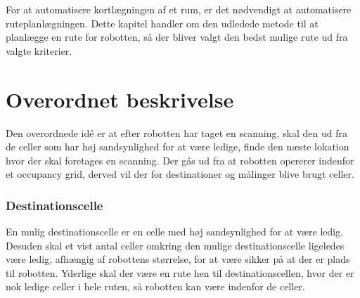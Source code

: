 
\newcommand{\unkcell}[3][]{\node (robot) [draw,fill=yellow, text centered, rectangle,
minimum height=\cellsize cm,minimum width=\cellsize cm, align=right] at ($(#2*\cellsize,#3*\cellsize) + (\cellsize/2,\cellsize/2)$) {$\scriptstyle #1$};}

\newcommand{\emptycell}[3][]{\node (robot) [draw,fill=green, text centered, rectangle,
minimum height=\cellsize cm,minimum width=\cellsize cm, align=right] at ($(#2*\cellsize,#3*\cellsize) + (\cellsize/2,\cellsize/2)$) {$\scriptstyle #1$};}

\newcommand{\occcell}[3][]{\node (robot) [draw,fill=red, text centered, rectangle,
minimum height=\cellsize cm,minimum width=\cellsize cm, align=right] at ($(#2*\cellsize,#3*\cellsize) + (\cellsize/2,\cellsize/2)$) {$\scriptstyle #1$};}

\newcommand{\scancell}[3][]{\node (robot) [draw,fill=orange, text centered, rectangle,
minimum height=\cellsize cm,minimum width=\cellsize cm, align=right] at ($(#2*\cellsize,#3*\cellsize) + (\cellsize/2,\cellsize/2)$) {$\scriptstyle #1$};}

\newcommand{\destcell}[3][]{\node (robot) [draw,fill=blue, text centered, rectangle,
minimum height=\cellsize cm,minimum width=\cellsize cm, align=right] at ($(#2*\cellsize,#3*\cellsize) + (\cellsize/2,\cellsize/2)$) {$\scriptstyle #1$};}

For at automatisere kortlægningen af et rum, er det nødvendigt at automatisere ruteplanlægningen.
Dette kapitel handler om den udledede metode til at planlægge en rute for robotten, så der bliver valgt den bedst mulige rute ud fra valgte kriterier.

\section{Overordnet beskrivelse}
Den overordnede idé er at efter robotten har taget en scanning, skal den ud fra de celler som har høj sandsynlighed for at være ledige, finde den næste lokation hvor der skal foretages en scanning.
Der gås ud fra at robotten opererer indenfor et occupancy grid, derved vil der for destinationer og målinger blive brugt celler.

\subsubsection{Destinationscelle}\label{rute:destinationscelle}
En mulig destinationscelle er en celle med høj sandsynlighed for at være ledig.
Desuden skal et vist antal celler omkring den mulige destinationscelle ligeledes være ledig, afhængig af robottens størrelse, for at være sikker på at der er plads til robotten.
Yderlige skal der være en rute hen til destinationscellen, hvor der er nok ledige celler i hele ruten, så robotten kan være indenfor de celler.


